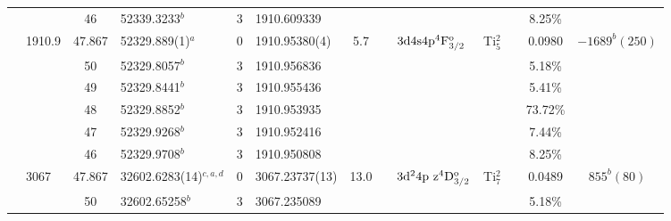 \begin{table*}
\begin{center}
{\begin{tabular}{:l;l;c;l;c;l;c;l;l;c;c;c;c}
\rowstyle{\itshape}               &        & 46        & 52339.3233$^{b}$                 & 3 &   1910.609339      &      & $                                        $ & $                                        $ &             &              & 8.25\%    & $     ^{}     $\\
                                  & 1910.9 & 47.867    & 52329.889(1)$^{a}$               & 0 &    1910.95380(4)   &  5.7 & $                                        $ & $3\rm{d}4\rm{s}4\rm{p}^4\rm{F}_{3/2}^{\rm o}$ & Ti$^2_{5}$  &              & 0.0980    & $-1689^{b}(250)$\\
\rowstyle{\itshape}               &        & 50        & 52329.8057$^{b}$                 & 3 &   1910.956836      &      & $                                        $ & $                                        $ &             &              & 5.18\%    & $     ^{}     $\\
\rowstyle{\itshape}               &        & 49        & 52329.8441$^{b}$                 & 3 &   1910.955436      &      & $                                        $ & $                                        $ &             &              & 5.41\%    & $     ^{}     $\\
\rowstyle{\itshape}               &        & 48        & 52329.8852$^{b}$                 & 3 &   1910.953935      &      & $                                        $ & $                                        $ &             &              & 73.72\%   & $     ^{}     $\\
\rowstyle{\itshape}               &        & 47        & 52329.9268$^{b}$                 & 3 &   1910.952416      &      & $                                        $ & $                                        $ &             &              & 7.44\%    & $     ^{}     $\\
\rowstyle{\itshape}               &        & 46        & 52329.9708$^{b}$                 & 3 &   1910.950808      &      & $                                        $ & $                                        $ &             &              & 8.25\%    & $     ^{}     $\\
                                  & 3067   & 47.867    & 32602.6283(14)$^{c,a,d}$         & 0 &    3067.23737(13)  & 13.0 & $                                        $ & $3\rm{d}^24\rm{p~z}^4\rm{D}_{3/2}^{\rm o}$ & Ti$^2_{7}$  &              & 0.0489    & $  855^{b}(80) $\\
\rowstyle{\itshape}               &        & 50        & 32602.65258$^{b}$                & 3 &   3067.235089      &      & $                                        $ & $                                        $ &             &              & 5.18\%    & $     ^{}     $\\

\end{tabular}}
\end{center}
\end{table*}
